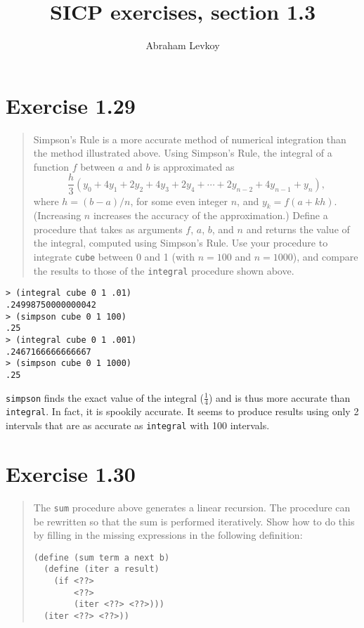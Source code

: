 \documentclass{article}
\author{Abraham Levkoy}
\title{SICP exercises, section 1.3}
\begin{document}
\maketitle

\section{Exercise 1.29}
\begin{quote}
    Simpson's Rule is a more accurate method of numerical integration than the
    method illustrated above. Using Simpson's Rule, the integral of a function
    $f$ between $a$ and $b$ is approximated as
    \begin{equation*}
        \frac{h}{3}(y_0+4y_1+2y_2+4y_3+2y_4+\cdots+2y_{n-2}+4y_{n-1}+y_n),
    \end{equation*}
    where $h=(b−a)/n$, for some even integer $n$, and $y_k=f(a+kh)$.
    (Increasing $n$ increases the accuracy of the approximation.) Define a
    procedure that takes as arguments $f$, $a$, $b$, and $n$ and returns the
    value of the integral, computed using Simpson’s Rule. Use your procedure to
    integrate \texttt{cube} between 0 and 1 (with $n=100$ and $n=1000$), and
    compare the results to those of the \texttt{integral} procedure shown
    above.
\end{quote}



\begin{lstlisting}
> (integral cube 0 1 .01)
.24998750000000042
> (simpson cube 0 1 100)
.25
> (integral cube 0 1 .001)
.2467166666666667
> (simpson cube 0 1 1000)
.25
\end{lstlisting}

\texttt{simpson} finds the exact value of the integral ($\frac{1}{4}$) and is
thus more accurate than \texttt{integral}. In fact, it is spookily accurate. It
seems to produce results using only 2 intervals that are as accurate as
\texttt{integral} with 100 intervals.

\section{Exercise 1.30}
\begin{quote}
    The \texttt{sum} procedure above generates a linear recursion. The
    procedure can be rewritten so that the sum is performed iteratively. Show
    how to do this by filling in the missing expressions in the following
    definition:
    \begin{lstlisting}
(define (sum term a next b)
  (define (iter a result)
    (if <??>
        <??>
        (iter <??> <??>)))
  (iter <??> <??>))
    \end{lstlisting}
\end{quote}
\end{document}
